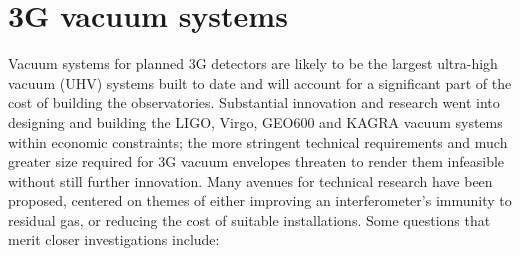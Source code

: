 \section{3G vacuum systems}
Vacuum systems for planned 3G detectors are likely to be the largest ultra-high vacuum (UHV) systems built to date and will account for a significant part of the cost of building the observatories. Substantial innovation and research went into designing and building the LIGO, Virgo, GEO600 and KAGRA vacuum systems within economic constraints; the more stringent technical requirements and much greater size required for 3G vacuum envelopes threaten to render them infeasible without still further innovation. Many avenues for technical research have been proposed,  centered on themes of either improving an interferometer’s immunity to residual gas, or reducing the cost of suitable installations. Some questions that merit closer investigations include:

